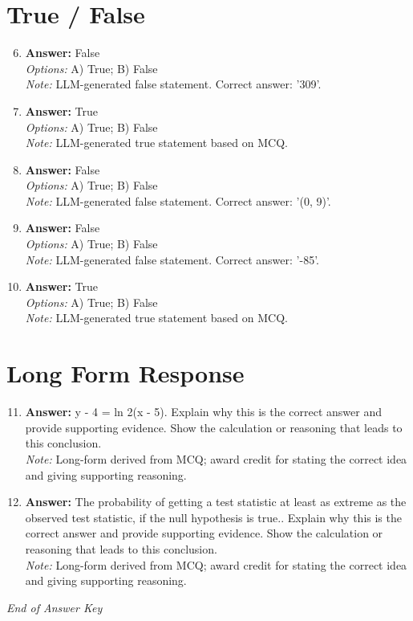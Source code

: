 \documentclass[12pt]{article}
\begin{document}
\section*{True / False}
\begin{enumerate}[label=\arabic*.]
\setcounter{enumi}{5}
\item \textbf{Answer:} False
\\ \textit{Options:} A) True; B) False
\\ \textit{Note:} LLM-generated false statement. Correct answer: '309'.
\item \textbf{Answer:} True
\\ \textit{Options:} A) True; B) False
\\ \textit{Note:} LLM-generated true statement based on MCQ.
\item \textbf{Answer:} False
\\ \textit{Options:} A) True; B) False
\\ \textit{Note:} LLM-generated false statement. Correct answer: '(0, 9)'.
\item \textbf{Answer:} False
\\ \textit{Options:} A) True; B) False
\\ \textit{Note:} LLM-generated false statement. Correct answer: '-85'.
\item \textbf{Answer:} True
\\ \textit{Options:} A) True; B) False
\\ \textit{Note:} LLM-generated true statement based on MCQ.
\end{enumerate}

\section*{Long Form Response}
\begin{enumerate}[label=\arabic*.]
\setcounter{enumi}{10}
\item \textbf{Answer:} y - 4 = ln 2(x - 5). Explain why this is the correct answer and provide supporting evidence. Show the calculation or reasoning that leads to this conclusion.
\\ \textit{Note:} Long-form derived from MCQ; award credit for stating the correct idea and giving supporting reasoning.
\item \textbf{Answer:} The probability of getting a test statistic at least as extreme as the observed test statistic, if the null hypothesis is true.. Explain why this is the correct answer and provide supporting evidence. Show the calculation or reasoning that leads to this conclusion.
\\ \textit{Note:} Long-form derived from MCQ; award credit for stating the correct idea and giving supporting reasoning.
\end{enumerate}

\vfill
\noindent\textit{End of Answer Key}
\end{document}
